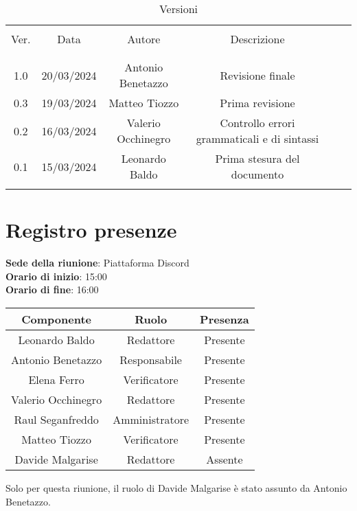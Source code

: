 \documentclass[italian,12pt]{article} %
\begin{document}


\newpage





\begin{table}[!h]
	\caption{Versioni}
	\begin{center}
		\begin{tabular}{ c c c c c c }
			\hline \\[-2ex]
			Ver. & Data & Autore & Descrizione \\
			\\[-2ex] \hline \\[-1.5ex]
			1.0 & 20/03/2024 & Antonio Benetazzo & Revisione finale \\
			0.3 & 19/03/2024 & Matteo Tiozzo & Prima revisione \\
			0.2 & 16/03/2024 & Valerio Occhinegro& Controllo errori grammaticali e di sintassi  \\
			0.1 & 15/03/2024 & Leonardo Baldo& Prima stesura del documento \\
			\\[-1.5ex] \hline
		\end{tabular}
	\end{center}
\end{table}
\newpage

\tableofcontents

\newpage

\section{Registro presenze}


\textbf{Sede della riunione}: Piattaforma Discord\\
\textbf{Orario di inizio}: 15:00\\
\textbf{Orario di fine}: 16:00\\

\begin{flushleft}
\begin{table}[!h]
\begin{tabular}{ |c|c|c| } 
	\hline
	\textbf{Componente} & \textbf{Ruolo} & \textbf{Presenza} \\
	\hline 
	Leonardo Baldo 		& Redattore & Presente \\ 
	Antonio Benetazzo 	& Responsabile & Presente \\
	Elena Ferro 		& Verificatore & Presente \\
	Valerio Occhinegro 	& Redattore & Presente \\
	Raul Seganfreddo 	& Amministratore & Presente \\
	Matteo Tiozzo 		& Verificatore & Presente \\ 
	Davide Malgarise 	& Redattore & Assente \\
	\hline
\end{tabular}
\end{table}
Solo per questa riunione, il ruolo di Davide Malgarise è stato assunto da Antonio Benetazzo.
\end{flushleft}
\end{document}

